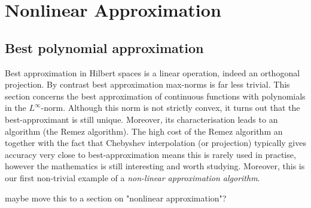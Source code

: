 
\section{Nonlinear Approximation}
%
\label{sec:nonlin}
%

\subsection{Best polynomial approximation}
%
\label{sec:poly:bestapprox}
%
Best approximation in Hilbert spaces is a linear operation, indeed an orthogonal
projection. By contrast best approximation max-norms is far less trivial. This
section concerns the best approximation of continuous functions with polynomials
in the $L^\infty$-norm. Although this norm is not strictly convex, it turns out
that the best-approximant is still unique. Moreover, its characterisation leads
to an algorithm (the Remez algorithm). The high cost of the Remez algorithm an
together with the fact that Chebyshev interpolation (or projection) typically
gives accuracy very close to best-approximation means this is rarely used in
practise, however the mathematics is still interesting and worth studying.
Moreover, this is our first non-trivial example of a {\em non-linear
approximation algorithm}.

\alert{maybe move this to a section on "nonlinear approximation"?}

